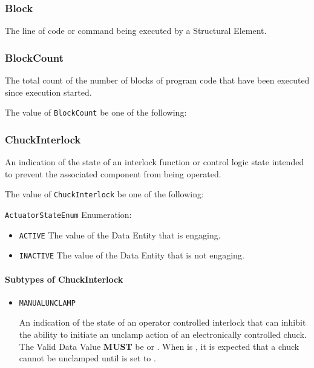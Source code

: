 \FloatBarrier

\subsubsection{Block}
\label{sec:Block}



The line of code or command being executed by a  \gls{Structural Element}.


\subsubsection{BlockCount}
\label{sec:BlockCount}



The total count of the number of blocks of program code that have been executed since execution started.


The value of \texttt{BlockCount} \MUST be one of the following: 

\FloatBarrier

\subsubsection{ChuckInterlock}




An indication of the state of an interlock function or control logic state intended to prevent the associated  component from being operated.


The value of \texttt{ChuckInterlock} \MUST be one of the following: 


\texttt{ActuatorStateEnum} Enumeration:

\begin{itemize}
\item \texttt{ACTIVE} \newline The value of the \gls{Data Entity} that is engaging. 
\item \texttt{INACTIVE} \newline The value of the \gls{Data Entity} that is not engaging. 
\end{itemize}

\FloatBarrier

\paragraph{Subtypes of ChuckInterlock}\mbox{}
\label{sec:Subtypes of ChuckInterlock}

\begin{itemize}

\item \texttt{MANUAL\textunderscore UNCLAMP}


An indication of the state of an operator controlled interlock that can inhibit the ability to initiate an unclamp action of an electronically controlled chuck.
 The \gls{Valid Data Value} \textbf{MUST} be  or . 
 When  is , it is expected that a chuck cannot be unclamped until  is set to . 


\end{itemize}

